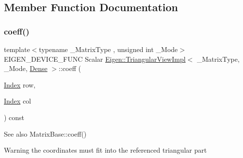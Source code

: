 \subsection{Member Function Documentation}
\mbox{\label{class_eigen_1_1_triangular_view_impl_3_01___matrix_type_00_01___mode_00_01_dense_01_4_a906168fa5121cfe301bc801df50807ad}} 
\subsubsection{\texorpdfstring{coeff()}{coeff()}}
{\footnotesize\ttfamily template$<$typename \+\_\+\+Matrix\+Type , unsigned int \+\_\+\+Mode$>$ \\
E\+I\+G\+E\+N\+\_\+\+D\+E\+V\+I\+C\+E\+\_\+\+F\+U\+NC Scalar \mbox{\hyperlink{class_eigen_1_1_triangular_view_impl}{Eigen\+::\+Triangular\+View\+Impl}}$<$ \+\_\+\+Matrix\+Type, \+\_\+\+Mode, \mbox{\hyperlink{struct_eigen_1_1_dense}{Dense}} $>$\+::coeff (\begin{DoxyParamCaption}\item[{\mbox{\hyperlink{struct_eigen_1_1_eigen_base_a554f30542cc2316add4b1ea0a492ff02}{Index}}}]{row,  }\item[{\mbox{\hyperlink{struct_eigen_1_1_eigen_base_a554f30542cc2316add4b1ea0a492ff02}{Index}}}]{col }\end{DoxyParamCaption}) const\hspace{0.3cm}{\ttfamily [inline]}}

\begin{DoxySeeAlso}{See also}
Matrix\+Base\+::coeff() 
\end{DoxySeeAlso}
\begin{DoxyWarning}{Warning}
the coordinates must fit into the referenced triangular part 
\end{DoxyWarning}
\mbox{\label{class_eigen_1_1_triangular_view_impl_3_01___matrix_type_00_01___mode_00_01_dense_01_4_a451953e43fc2e9231f05e7926d0e9d98}} 
